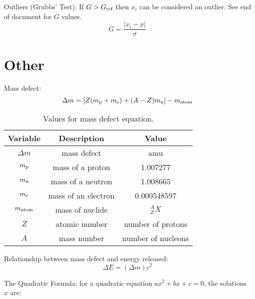 \documentclass[10pt]{article}
\begin{document}
Outliers (Grubbs' Test): If $G > G_{\textnormal{ref}}$ then $x_i$ can be considered an outlier. See end of document for $G$ values.
\begin{equation*}
G = \frac{|x_i-\overline x|}{\sigma}
\end{equation*}


\section{Other}

Mass defect:
\begin{equation*}
\Delta m = [Z(m_{\textnormal{p}}+m_\textnormal{e})+(A-Z)m_\textnormal{n}]-m_\textnormal{atom}
\end{equation*}

\begin{table}[H]
    \centering
    \caption{Values for mass defect equation.}
        \begin{tabular}{ccc}
            \toprule
               Variable & Description & Value \\
               \midrule
               $\Delta m$ & mass defect & amu \\
               $m_\textnormal{p}$ & mass of a proton & 1.007277 \\
               $m_\textnormal{n}$ & mass of a neutron & 1.008665 \\
               $m_\textnormal{e}$ & mass of an electron & 0.000548597 \\
               $m_\textnormal{atom}$ & mass of nuclide & $^A_Z X$\\
               $Z$ & atomic number & number of protons \\
               $A$ & mass number & number of nucleons \\
            \bottomrule
        \end{tabular}
    \label{tabgrav}
\end{table}

Relationship between mass defect and energy released: 
\begin{equation*}
\Delta E = (\Delta m)c^2
\end{equation*}

The Quadratic Formula: for a quadratic equation $ax^2+bx+c=0$, the solutions $x$ are:
\end{document}
